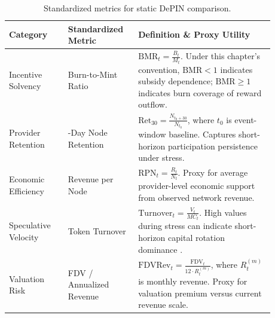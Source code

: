 \begin{table}[htbp]
    \centering
    \small
    \renewcommand{\arraystretch}{1.35}
    \begin{tabular}{>{\raggedright\arraybackslash}p{0.20\linewidth} >{\raggedright\arraybackslash}p{0.22\linewidth} >{\raggedright\arraybackslash}p{0.46\linewidth}}
        \toprule
        \textbf{Category} & \textbf{Standardized Metric} & \textbf{Definition \& Proxy Utility} \\
        \midrule
        Incentive Solvency & Burn-to-Mint Ratio & \( \mathrm{BMR}_t = \frac{B_t}{M_t} \). Under this chapter's convention, \( \mathrm{BMR}<1 \) indicates subsidy dependence; \( \mathrm{BMR}\ge1 \) indicates burn coverage of reward outflow. \\
        \midrule
        Provider Retention & 30-Day Node Retention & \( \mathrm{Ret}_{30} = \frac{N_{t_0+30}}{N_{t_0}} \), where \(t_0\) is event-window baseline. Captures short-horizon participation persistence under stress. \\
        \midrule
        Economic Efficiency & Revenue per Node & \( \mathrm{RPN}_t = \frac{R_t}{N_t} \). Proxy for average provider-level economic support from observed network revenue. \\
        \midrule
        Speculative Velocity & Token Turnover & \( \mathrm{Turnover}_t = \frac{V_t}{MC_t} \). High values during stress can indicate short-horizon capital rotation dominance \cite{CFA2018}. \\
        \midrule
        Valuation Risk & FDV / Annualized Revenue & \( \mathrm{FDVRev}_t = \frac{\mathrm{FDV}_t}{12 \cdot R^{(m)}_t} \), where \(R^{(m)}_t\) is monthly revenue. Proxy for valuation premium versus current revenue scale. \\
        \bottomrule
    \end{tabular}
    \caption{Standardized metrics for static DePIN comparison.}
    \label{tab:comparative_metrics}
\end{table}

